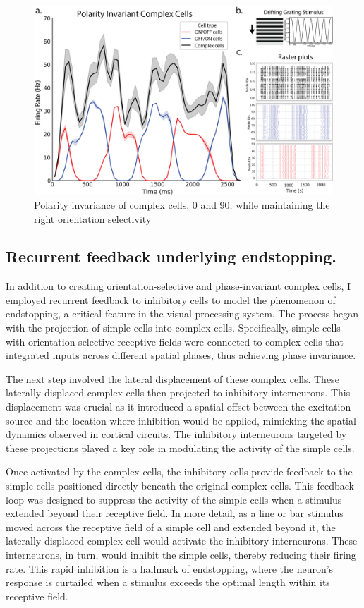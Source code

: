 \documentclass[12pt]{article}
\begin{document}
\begin{figure}[H]
    \centering
    \includegraphics[width=1 \textwidth]{figures/complex_invariance_figure.png}
    \caption{Polarity invariance of complex cells, 0 and 90; while maintaining the right orientation selectivity}
    \label{fig:polarity invariance}
\end{figure}

\subsection{Recurrent feedback underlying endstopping.}
In addition to creating orientation-selective and phase-invariant complex cells, I employed recurrent feedback to inhibitory cells to model the phenomenon of endstopping, a critical feature in the visual processing system. The process began with the projection of simple cells into complex cells. Specifically, simple cells with orientation-selective receptive fields were connected to complex cells that integrated inputs across different spatial phases, thus achieving phase invariance.

The next step involved the lateral displacement of these complex cells. These laterally displaced complex cells then projected to inhibitory interneurons. This displacement was crucial as it introduced a spatial offset between the excitation source and the location where inhibition would be applied, mimicking the spatial dynamics observed in cortical circuits. The inhibitory interneurons targeted by these projections played a key role in modulating the activity of the simple cells.

Once activated by the complex cells, the inhibitory cells provide feedback to the simple cells positioned directly beneath the original complex cells. This feedback loop was designed to suppress the activity of the simple cells when a stimulus extended beyond their receptive field. In more detail, as a line or bar stimulus moved across the receptive field of a simple cell and extended beyond it, the laterally displaced complex cell would activate the inhibitory interneurons. These interneurons, in turn, would inhibit the simple cells, thereby reducing their firing rate. This rapid inhibition is a hallmark of endstopping, where the neuron's response is curtailed when a stimulus exceeds the optimal length within its receptive field.
\end{document}
